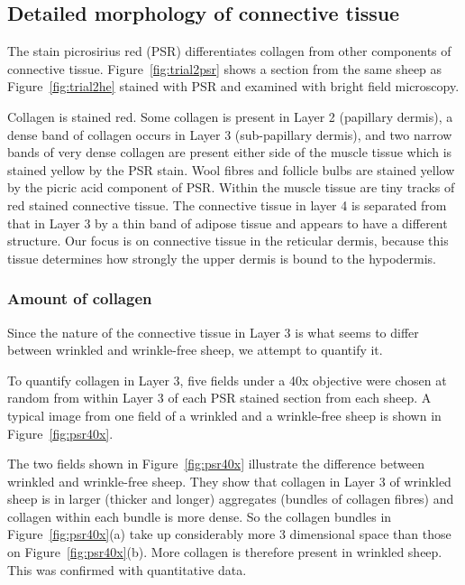 \documentclass[]{interact}
\theoremstyle{plain}%
\theoremstyle{definition}
\theoremstyle{remark}
\begin{document}
\subsection{Detailed morphology of connective tissue} 
The stain picrosirius red (PSR) differentiates collagen from other components of connective tissue. Figure~\ref{fig:trial2psr} shows a section from the same sheep as Figure~\ref{fig:trial2he} stained with PSR and examined with bright field microscopy. 

Collagen is stained red. Some collagen is present in Layer 2 (papillary dermis), a dense band of collagen occurs in Layer 3 (sub-papillary dermis), and two narrow bands of very dense collagen are present either side of the muscle tissue which is stained yellow by the PSR stain.   Wool fibres and follicle bulbs are stained yellow by the picric acid component of PSR. Within the  muscle tissue are tiny tracks of red stained connective tissue.
The connective tissue in layer 4 is separated from that in Layer 3 by a thin band of adipose tissue and appears to have a different structure.  Our focus is on connective tissue in the reticular dermis, because this tissue determines how strongly the upper dermis is bound to the hypodermis.


\subsubsection{Amount of collagen}
Since the nature of the connective tissue in Layer 3 is what seems to differ between wrinkled and wrinkle-free sheep, we attempt to quantify  it.

To quantify collagen in Layer 3, five fields under a 40x objective were chosen at random from within Layer 3  of each PSR stained section from each sheep.  A typical image from one field of a wrinkled and a wrinkle-free sheep is shown in Figure~\ref{fig:psr40x}.

The two fields shown in Figure~\ref{fig:psr40x} illustrate the difference between wrinkled and wrinkle-free sheep. They show that collagen in Layer 3 of wrinkled sheep is in larger (thicker and longer) aggregates (bundles of collagen fibres) and collagen within each bundle is more dense. So the collagen bundles in Figure~\ref{fig:psr40x}(a) take up considerably more 3 dimensional space than those on Figure~\ref{fig:psr40x}(b). More collagen is therefore present in wrinkled sheep. This was confirmed  with quantitative data.
\end{document}
